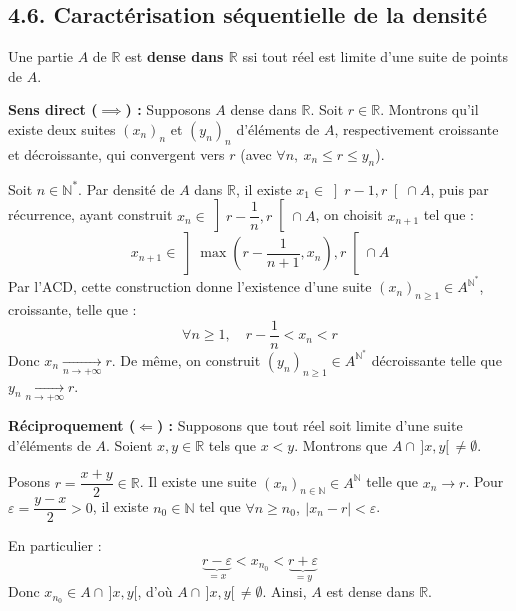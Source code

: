 \documentclass[a4paper,11pt]{article}
\newcommand{\R}{\mathbb{R}}
\newcommand{\N}{\mathbb{N}}
\newcommand{\mot}[1]{\textcolor{bordeaux}{\textbf{#1}}}
\begin{document}
\newpage
\subsection{4.6. Caractérisation séquentielle de la densité}

\begin{proposition}
Une partie $A$ de $\R$ est \mot{dense dans $\R$} ssi tout réel est limite d'une suite de points de $A$.
\end{proposition}

\begin{demonstration}
\textbf{Sens direct ($\implies$) :} Supposons $A$ dense dans $\R$. Soit $r \in \R$. Montrons qu'il existe deux suites $(x_n)_n$ et $(y_n)_n$ d'éléments de $A$, respectivement croissante et décroissante, qui convergent vers $r$ (avec $\forall n, \ x_n \le r \le y_n$).

Soit $n \in \N^*$. Par densité de $A$ dans $\R$, il existe $x_1 \in \left]r - 1, r\right[ \cap A$, puis par récurrence, ayant construit $x_n \in \left]r - \dfrac{1}{n}, r\right[ \cap A$, on choisit $x_{n+1}$ tel que :
\[
x_{n+1} \in \left] \max\left(r - \frac{1}{n+1}, x_n\right), r \right[ \cap A
\]
Par l'ACD, cette construction donne l'existence d'une suite $(x_n)_{n \ge 1} \in A^{\N^*}$, croissante, telle que :
\[
\forall n \ge 1, \quad r - \frac{1}{n} < x_n < r
\]
Donc $x_n \xrightarrow[n \to +\infty]{} r$. De même, on construit $(y_n)_{n \ge 1} \in A^{\N^*}$ décroissante telle que $y_n \xrightarrow[n \to +\infty]{} r$.

\textbf{Réciproquement ($\Longleftarrow$) :} Supposons que tout réel soit limite d'une suite d'éléments de $A$. Soient $x, y \in \R$ tels que $x < y$. Montrons que $A \cap \, ]x, y[ \, \neq \emptyset$.

Posons $r = \dfrac{x + y}{2} \in \R$. Il existe une suite $(x_n)_{n \in \N} \in A^{\N}$ telle que $x_n \to r$. Pour $\varepsilon = \dfrac{y - x}{2} > 0$, il existe $n_0 \in \N$ tel que $\forall n \ge n_0, \ |x_n - r| < \varepsilon$.

En particulier :
\[
\underbrace{r - \varepsilon}_{= x} < x_{n_0} < \underbrace{r + \varepsilon}_{= y}
\]
Donc $x_{n_0} \in A \cap \, ]x, y[$, d'où $A \cap \, ]x, y[ \, \neq \emptyset$. Ainsi, $A$ est dense dans $\R$.
\end{demonstration}

\begin{center}
\end{center}
\end{document}
